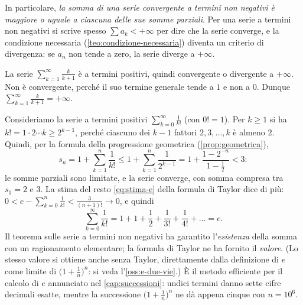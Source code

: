 In particolare, \emph{la somma di una serie convergente a termini non negativi è
maggiore o uguale a ciascuna delle sue somme parziali}. Per una serie a termini non
negativi si scrive spesso $\sum a_{k}<+\infty$ per dire che la serie converge, e la
condizione necessaria (\cref{teo:condizione-necessaria}) diventa un criterio di
divergenza: se $a_{n}$ non tende a zero, la serie diverge a $+\infty$.

\begin{esempio}\label{es:k-su-k1}
La serie $\sum_{k=1}^{\infty}\frac k{k+1}$ è a termini positivi, quindi convergente o divergente
a $+\infty$. Non è convergente, perché il suo termine generale tende a $1$ e non a $0$.
Dunque $\sum_{k=1}^{\infty}\frac k{k+1}=+\infty$.
\end{esempio}

\begin{esempio}\label{es:serie-fattoriali}
Consideriamo la serie a termini positivi $\sum_{k=0}^{\infty}\frac1{k!}$ (con $0!=1$). Per $k\ge1$
si ha $k!=1\cdot2\cdots k\ge2^{k-1}$, perché ciascuno dei $k-1$ fattori $2,3,\dots,k$ è almeno
$2$. Quindi, per la formula della progressione geometrica (\cref{prop:geometrica}),
\[
  s_{n}=1+\sum_{k=1}^{n}\frac1{k!}\le1+\sum_{k=1}^{n}\frac1{2^{k-1}}=1+\frac{1-2^{-n}}{1-\frac12}<3 :
\]
le somme parziali sono limitate, e la serie converge, con somma compresa tra $s_{1}=2$ e
$3$. La stima del resto \eqref{eq:stima-e} della formula di Taylor dice di più:
$0<e-\sum_{k=0}^{n}\frac1{k!}<\frac3{(n+1)!}\to0$, e quindi
\begin{equation}\label{eq:e-serie}
  \sum_{k=0}^{\infty}\frac1{k!}=1+1+\frac12+\frac1{3!}+\frac1{4!}+\dots=e .
\end{equation}
Il teorema sulle serie a termini non negativi ha garantito l'\emph{esistenza} della
somma con un ragionamento elementare; la formula di Taylor ne ha fornito il
\emph{valore}. (Lo stesso valore si ottiene anche senza Taylor, direttamente dalla
definizione di $e$ come limite di $\bigl(1+\frac1n\bigr)^{n}$: si veda
l'\cref{oss:e-due-vie}.) È il metodo efficiente per il calcolo di $e$ annunciato nel
\cref{cap:successioni}: undici termini danno sette cifre decimali esatte, mentre la
successione $\bigl(1+\frac1n\bigr)^{n}$ ne dà appena cinque con $n=10^{6}$.
\end{esempio}
